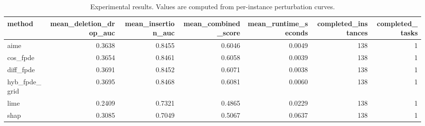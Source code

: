\begin{table}[t]
\caption{Experimental results. Values are computed from per-instance perturbation curves.}
\label{tab:main_results_computed}
\centering
\begin{tabular}{lrrrrrr}
\toprule
method & mean\_deletion\_drop\_auc & mean\_insertion\_auc & mean\_combined\_score & mean\_runtime\_seconds & completed\_instances & completed\_tasks \\
\midrule
aime & 0.3638 & 0.8455 & 0.6046 & 0.0049 & 138 & 1 \\
cos\_fpde & 0.3654 & 0.8461 & 0.6058 & 0.0039 & 138 & 1 \\
diff\_fpde & 0.3691 & 0.8452 & 0.6071 & 0.0038 & 138 & 1 \\
hyb\_fpde\_grid & 0.3695 & 0.8468 & 0.6081 & 0.0060 & 138 & 1 \\
lime & 0.2409 & 0.7321 & 0.4865 & 0.0229 & 138 & 1 \\
shap & 0.3085 & 0.7049 & 0.5067 & 0.0637 & 138 & 1 \\
\bottomrule
\end{tabular}

\end{table}
